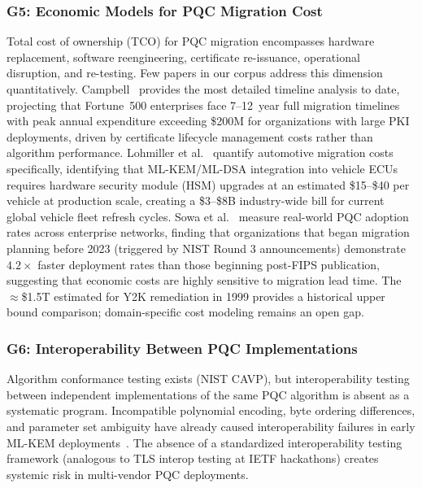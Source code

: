 \documentclass[journal]{IEEEtran}
\begin{document}
\subsubsection{G5: Economic Models for PQC Migration Cost}

Total cost of ownership (TCO) for PQC migration encompasses hardware
replacement, software reengineering, certificate re-issuance, operational
disruption, and re-testing. Few papers in our corpus address this dimension
quantitatively. Campbell~\cite{campbell2025enterprise} provides the most
detailed timeline analysis to date, projecting that Fortune~500 enterprises
face 7--12~year full migration timelines with peak annual expenditure
exceeding \$200M for organizations with large PKI deployments, driven by
certificate lifecycle management costs rather than algorithm performance.
Lohmiller et al.~\cite{lohmiller2025survey} quantify automotive migration
costs specifically, identifying that ML-KEM/ML-DSA integration into vehicle
ECUs requires hardware security module (HSM) upgrades at an estimated
\$15--\$40 per vehicle at production scale, creating a \$3--\$8B industry-wide
bill for current global vehicle fleet refresh cycles. Sowa et
al.~\cite{sowa2024network} measure real-world PQC adoption rates across
enterprise networks, finding that organizations that began migration planning
before 2023 (triggered by NIST Round 3 announcements) demonstrate $4.2\times$
faster deployment rates than those beginning post-FIPS publication, suggesting
that economic costs are highly sensitive to migration lead time. The
$\approx$\$1.5T estimated for Y2K remediation in 1999 provides a historical
upper bound comparison; domain-specific cost modeling remains an open gap.

\subsubsection{G6: Interoperability Between PQC Implementations}

Algorithm conformance testing exists (NIST CAVP), but interoperability testing
between independent implementations of the same PQC algorithm is absent as a
systematic program. Incompatible polynomial encoding, byte ordering differences,
and parameter set ambiguity have already caused interoperability failures in
early ML-KEM deployments~\cite{oqs2024}. The absence of a standardized
interoperability testing framework (analogous to TLS interop testing at
IETF hackathons) creates systemic risk in multi-vendor PQC deployments.
\end{document}
